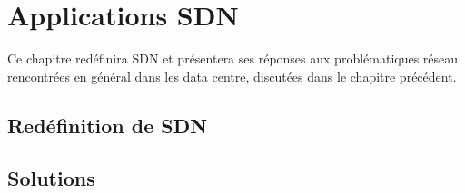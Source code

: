 
\chapter{Applications SDN}

Ce chapitre redéfinira SDN et présentera ses réponses aux problématiques réseau rencontrées en général dans les data centre, discutées dans le chapitre précédent.

\section{Redéfinition de SDN}

\section{Solutions}